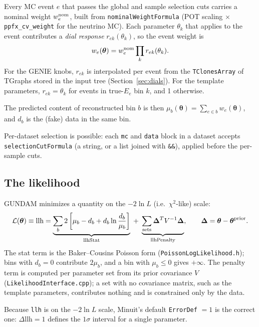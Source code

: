 \documentclass[11pt]{article}
\newcommand{\code}[1]{\texttt{#1}}
\newcommand{\chisq}{\chi^2}
\begin{document}
Every MC event $e$ that passes the global and sample selection cuts carries a
nominal weight $w^{\rm nom}_e$, built from \code{nominalWeightFormula} (POT
scaling $\times$ \code{ppfx\_cv\_weight} for the neutrino MC). Each parameter
$\theta_k$ that applies to the event contributes a \emph{dial response}
$r_{ek}(\theta_k)$, so the event weight is
\begin{equation}
  w_e(\boldsymbol\theta) = w^{\rm nom}_e \prod_k r_{ek}(\theta_k).
\end{equation}
For the GENIE knobs, $r_{ek}$ is interpolated per event from the
\code{TClonesArray} of TGraphs stored in the input tree (Section~\ref{sec:dials}).
For the template parameters, $r_{ek} = \theta_k$ for events in true-$E_e$ bin $k$,
and 1 otherwise.

The predicted content of reconstructed bin $b$ is then
$\mu_b(\boldsymbol\theta) = \sum_{e\in b} w_e(\boldsymbol\theta)$, and $d_b$ is the
(fake) data in the same bin.

Per-dataset selection is possible: each \code{mc} and \code{data} block in a
dataset accepts \code{selectionCutFormula} (a string, or a list joined with
\code{\&\&}), applied before the per-sample cuts.

\subsection{The likelihood}

GUNDAM minimizes a quantity on the $-2\ln L$ (i.e.\ $\chisq$-like) scale:
\begin{equation}
  \mathcal{L}(\boldsymbol\theta) \equiv \text{llh}
  = \underbrace{\sum_b 2\left[\mu_b - d_b + d_b\ln\frac{d_b}{\mu_b}\right]}_{\text{llhStat}}
  \;+\; \underbrace{\sum_{\text{sets}} \boldsymbol\Delta^{T} V^{-1} \boldsymbol\Delta}_{\text{llhPenalty}},
  \qquad \boldsymbol\Delta = \boldsymbol\theta - \boldsymbol\theta^{\rm prior}.
  \label{eq:llh}
\end{equation}
The stat term is the Baker--Cousins Poisson form
(\code{PoissonLogLikelihood.h}); bins with $d_b=0$ contribute $2\mu_b$, and a
bin with $\mu_b\le 0$ gives $+\infty$. The penalty term is computed per parameter
set from its prior covariance $V$ (\code{LikelihoodInterface.cpp}); a set with no
covariance matrix, such as the template parameters, contributes nothing and is
constrained only by the data.

Because \code{llh} is on the $-2\ln L$ scale, Minuit's default
\code{ErrorDef} $=1$ is the correct one: $\Delta\text{llh} = 1$ defines the
$1\sigma$ interval for a single parameter.
\end{document}
